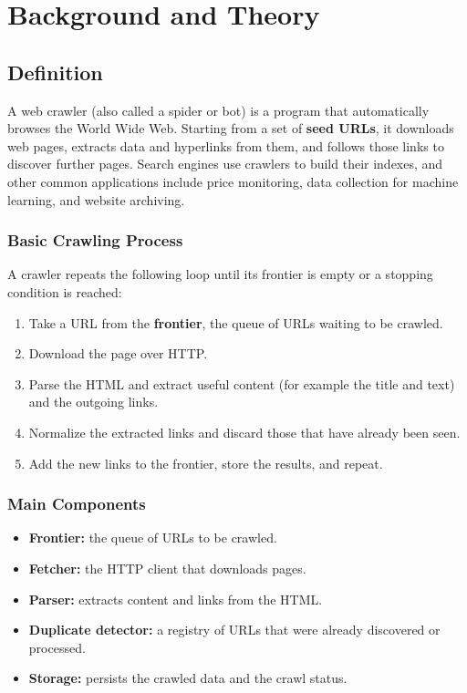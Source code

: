 \newpage
\section{Background and Theory}


\subsection{Definition}
A web crawler (also called a spider or bot) is a program that automatically browses the World Wide Web. Starting from a set of \textbf{seed URLs}, it downloads web pages, extracts data and hyperlinks from them, and follows those links to discover further pages. Search engines use crawlers to build their indexes, and other common applications include price monitoring, data collection for machine learning, and website archiving.


\subsubsection{Basic Crawling Process}
A crawler repeats the following loop until its frontier is empty or a stopping condition is reached:
\begin{enumerate}
    \item Take a URL from the \textbf{frontier}, the queue of URLs waiting to be crawled.
    \item Download the page over HTTP.
    \item Parse the HTML and extract useful content (for example the title and text) and the outgoing links.
    \item Normalize the extracted links and discard those that have already been seen.
    \item Add the new links to the frontier, store the results, and repeat.
\end{enumerate}


\subsubsection{Main Components}
\begin{itemize}
    \item \textbf{Frontier:} the queue of URLs to be crawled.
    \item \textbf{Fetcher:} the HTTP client that downloads pages.
    \item \textbf{Parser:} extracts content and links from the HTML.
    \item \textbf{Duplicate detector:} a registry of URLs that were already discovered or processed.
    \item \textbf{Storage:} persists the crawled data and the crawl status.
\end{itemize}



